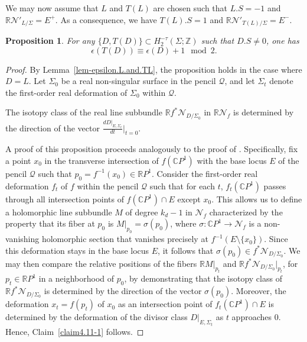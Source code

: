 \documentclass[11pt]{amsart}
\numberwithin{equation}{section}
\theoremstyle{definition}
\theoremstyle{plain}
\newtheorem{proposition}[definition]{Proposition}
\theoremstyle{remark}
\newenvironment{claim}[1]{\renewcommand\theinnercustomclaim{#1}\innercustomclaim}{\endinnercustomclaim}
\newcommand{\R}{\mathbb{R}}
\newcommand{\Z}{\mathbb{Z}}
\newcommand{\C}{\mathbb{C}}
\begin{document}
We may now assume that $L$ and $T(L)$ are chosen such that $L.S=-1$ and $\R \mathcal{N}'_{L/\Sigma}=E^+$. As a consequence, we have  $T(L).S=1$ and $\R \mathcal{N}'_{T(L)/\Sigma}=E^-$.

 \begin{proposition}\label{prop-function.epsilon1}
For any $\{D,T(D)\}\subset H_2^{-\tau}(\Sigma;\Z)$ such that $D.S\neq 0$, one has
$$\epsilon(T(D))\equiv \epsilon(D)+1 \mod 2.$$
\end{proposition}

 \begin{proof}
 By Lemma~\ref{lem-epsilon.L.and.TL}, the proposition holds in the case where $D=L$. Let $\Sigma_0$ be a real non-singular surface in the pencil $\mathcal{Q}$, and let $\Sigma_t$ denote the first-order real deformation of $\Sigma_0$ within $\mathcal{Q}$.

\begin{claim}{1}\label{claim4.11-1}
The isotopy class of the real line subbundle $\R f^*\mathcal{N}_{D/\Sigma_0}$ in $\R \mathcal{N}_f$  is determined by the direction of the vector $\frac{dD|_{E,\Sigma_t}}{dt}\Big|_{t=0}$.
\end{claim}

A proof of this proposition proceeds analogously to the proof of \cite[Proposition 4.4]{brugalle2016pencils}. 
Specifically, fix a point  $x_0$ in the transverse intersection of $f(\C P^1)$ with the base locus $E$ of the pencil $\mathcal{Q}$ such that $p_0=f^{-1}(x_0) \in \R P^1$. 
Consider the first-order real deformation  $f_t$ of $f$ within the pencil $\mathcal{Q}$ such that for each $t$, $f_t(\C P^1)$ passes through all intersection  points of $f(\C P^1)\cap E$ except $x_0$. This allows us to define a holomorphic line subbundle $M$ of degree $k_d-1$ in $\mathcal{N}_{f}$ characterized by the property that its fiber at $p_0$ is $M|_{p_0}=\sigma(p_0)$, where $\sigma\colon \C P^1\to \mathcal{N}_f$ is a non-vanishing holomorphic section that vanishes precisely at $f^{-1}(E\setminus \{x_0\})$.  Since this deformation stays in the base locus $E$, it follows that  $\sigma(p_0)\in f^*\mathcal{N}_{D/\Sigma_0}$. We may then compare the relative positions of the fibers  $\R M|_{p_t}$ and $\R f^*\mathcal{N}_{D/\Sigma_0}|_{p_t}$, for $p_t\in \R P^1$ in a neighborhood of $p_0$, by demonstrating that the isotopy class of $\R f^*\mathcal{N}_{D/\Sigma_0}$ is determined by the direction of the vector $\sigma(p_0)$.  
 Moreover, the deformation $x_t=f(p_t)$ of $x_0$ as an intersection point of $f_t(\C P^1)\cap E$ is determined by the deformation of the divisor class $D|_{E,\Sigma_t}$ as $t$ approaches $0$. Hence, Claim~\ref{claim4.11-1} follows. 
    


\end{proof}
\end{document}

